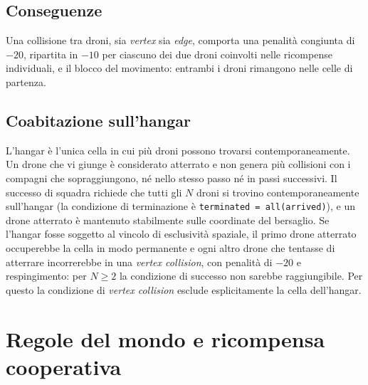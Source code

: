 \documentclass[12pt,a4paper,twoside]{report}
\begin{document}
\subsection{Conseguenze}
Una collisione tra droni, sia \emph{vertex} sia \emph{edge}, comporta una penalità congiunta di $-20$, ripartita in $-10$ per ciascuno dei due droni coinvolti nelle ricompense individuali, e il blocco del movimento: entrambi i droni rimangono nelle celle di partenza.

\subsection{Coabitazione sull'hangar}
L'hangar è l'unica cella in cui più droni possono trovarsi contemporaneamente. Un drone che vi giunge è considerato atterrato e non genera più collisioni con i compagni che sopraggiungono, né nello stesso passo né in passi successivi. Il successo di squadra richiede che tutti gli $N$ droni si trovino contemporaneamente sull'hangar (la condizione di terminazione è \texttt{terminated = all(arrived)}), e un drone atterrato è mantenuto stabilmente sulle coordinate del bersaglio. Se l'hangar fosse soggetto al vincolo di esclusività spaziale, il primo drone atterrato occuperebbe la cella in modo permanente e ogni altro drone che tentasse di atterrare incorrerebbe in una \emph{vertex collision}, con penalità di $-20$ e respingimento: per $N \ge 2$ la condizione di successo non sarebbe raggiungibile. Per questo la condizione di \emph{vertex collision} esclude esplicitamente la cella dell'hangar.

\section{Regole del mondo e ricompensa cooperativa}
\label{sec:regole_ricompensa}
\end{document}
